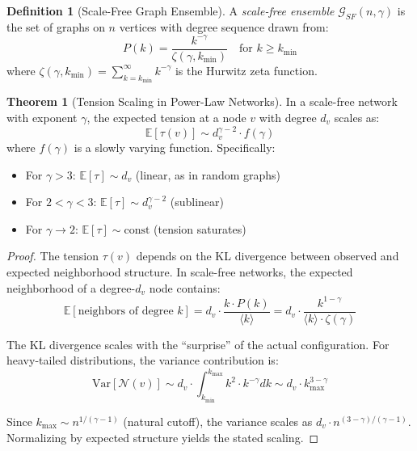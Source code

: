 \documentclass[12pt,a4paper]{article}
\theoremstyle{definition}
\newtheorem{definition}{Definition}[section]
\newtheorem{theorem}{Theorem}[section]
\theoremstyle{remark}
\begin{document}
\begin{definition}[Scale-Free Graph Ensemble]
A \emph{scale-free ensemble} $\mathcal{G}_{SF}(n, \gamma)$ is the set of graphs on $n$ vertices with degree sequence drawn from:
\begin{equation}
    P(k) = \frac{k^{-\gamma}}{\zeta(\gamma, k_{\min})} \quad \text{for } k \geq k_{\min}
\end{equation}
where $\zeta(\gamma, k_{\min}) = \sum_{k=k_{\min}}^{\infty} k^{-\gamma}$ is the Hurwitz zeta function.
\end{definition}

\begin{theorem}[Tension Scaling in Power-Law Networks]
\label{thm:sf-tension}
In a scale-free network with exponent $\gamma$, the expected tension at a node $v$ with degree $d_v$ scales as:
\begin{equation}
    \boxed{
    \mathbb{E}[\tau(v)] \sim d_v^{\gamma - 2} \cdot f(\gamma)
    }
\end{equation}
where $f(\gamma)$ is a slowly varying function. Specifically:
\begin{itemize}
    \item For $\gamma > 3$: $\mathbb{E}[\tau] \sim d_v$ (linear, as in random graphs)
    \item For $2 < \gamma < 3$: $\mathbb{E}[\tau] \sim d_v^{\gamma - 2}$ (sublinear)
    \item For $\gamma \to 2$: $\mathbb{E}[\tau] \sim \text{const}$ (tension saturates)
\end{itemize}
\end{theorem}

\begin{proof}
The tension $\tau(v)$ depends on the KL divergence between observed and expected neighborhood structure. In scale-free networks, the expected neighborhood of a degree-$d_v$ node contains:
\begin{equation}
    \mathbb{E}[\text{neighbors of degree } k] = d_v \cdot \frac{k \cdot P(k)}{\langle k \rangle} = d_v \cdot \frac{k^{1-\gamma}}{\langle k \rangle \cdot \zeta(\gamma)}
\end{equation}

The KL divergence scales with the ``surprise'' of the actual configuration. For heavy-tailed distributions, the variance contribution is:
\begin{equation}
    \text{Var}[\mathcal{N}(v)] \sim d_v \cdot \int_{k_{\min}}^{k_{\max}} k^2 \cdot k^{-\gamma} dk \sim d_v \cdot k_{\max}^{3-\gamma}
\end{equation}

Since $k_{\max} \sim n^{1/(\gamma-1)}$ (natural cutoff), the variance scales as $d_v \cdot n^{(3-\gamma)/(\gamma-1)}$. Normalizing by expected structure yields the stated scaling.
\end{proof}
\end{document}
